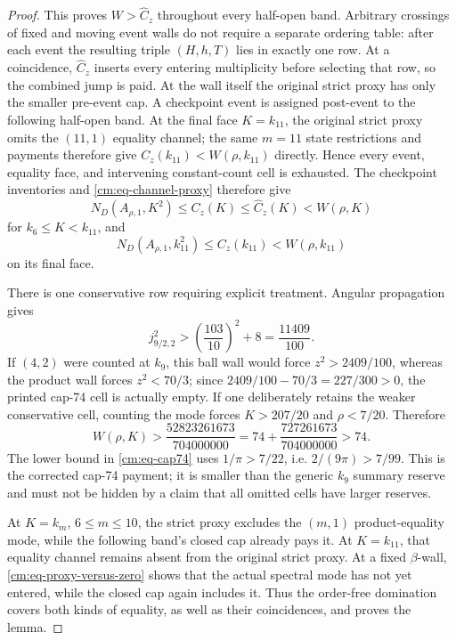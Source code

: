 \documentclass[11pt]{article}
\numberwithin{equation}{section}
\theoremstyle{definition}
\theoremstyle{remark}
\begin{document}
\begin{proof}
This proves \(W>\widehat C_z\) throughout every half-open band.  Arbitrary crossings
of fixed and moving event walls do not require a separate ordering table:
after each event the resulting triple \((H,h,T)\) lies in exactly one row.
At a coincidence, \(\widehat C_z\) inserts every entering multiplicity
before selecting that row, so the combined jump is paid.  At the wall
itself the original strict proxy has only the smaller pre-event cap.  A
checkpoint event is assigned post-event to the following half-open band.
At the final face \(K=k_{11}\), the original strict proxy omits the
\((11,1)\) equality channel; the same \(m=11\) state restrictions and
payments therefore give \(C_z(k_{11})<W(\rho,k_{11})\) directly.  Hence every
event, equality face, and intervening constant-count cell is exhausted.
The checkpoint inventories and \eqref{cm:eq-channel-proxy} therefore give
\[
 N_D(A_{\rho,1},K^2)\leq C_z(K)\leq\widehat C_z(K)<W(\rho,K)
\]
for \(k_6\leq K<k_{11}\), and
\[
 N_D(A_{\rho,1},k_{11}^2)\leq C_z(k_{11})<W(\rho,k_{11})
\]
on its final face.

There is one conservative row requiring explicit treatment.  Angular
propagation gives
\[
 j_{9/2,2}^2>\left(\frac{103}{10}\right)^2+8
 =\frac{11409}{100}.
\]
If \((4,2)\) were counted at \(k_9\), this ball wall would force
\(z^2>2409/100\), whereas the product wall forces \(z^2<70/3\); since
\(2409/100-70/3=227/300>0\), the printed cap-74 cell is actually empty.
If one deliberately retains the weaker conservative cell, counting the
mode forces \(K>207/20\) and \(\rho<7/20\).  Therefore
\begin{equation}
 W(\rho,K)>
 \frac{52823261673}{704000000}
 =74+\frac{727261673}{704000000}>74.
 \label{cm:eq-cap74}
\end{equation}
The lower bound in \eqref{cm:eq-cap74} uses
\(1/\pi>7/22\), i.e. \(2/(9\pi)>7/99\).
This is the corrected cap-74 payment; it is smaller than the generic
\(k_9\) summary reserve and must not be hidden by a claim that all omitted
cells have larger reserves.

At \(K=k_m\), \(6\leq m\leq10\), the strict proxy excludes the
\((m,1)\) product-equality mode, while the following band's closed cap
already pays it.  At \(K=k_{11}\), that equality channel remains absent
from the original strict proxy.  At a fixed
\(\beta\)-wall, \eqref{cm:eq-proxy-versus-zero} shows that the actual
spectral mode has not yet entered, while the closed cap again includes it.
Thus the order-free domination covers both kinds of equality, as well as
their coincidences, and proves the lemma.
\end{proof}
\end{document}
